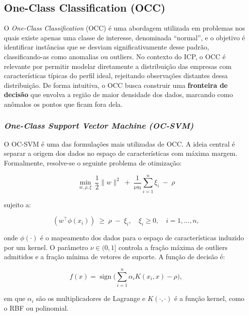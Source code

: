 \subsection{\textbf{One-Class Classification (OCC)}}

O \textit{One-Class Classification} (OCC) é uma abordagem utilizada em
problemas nos quais existe apenas uma classe de interesse, denominada
``normal'', e o objetivo é identificar instâncias que se desviam
significativamente desse padrão, classificando-as como anomalias ou
outliers. No contexto do ICP, o OCC é relevante por permitir modelar
diretamente a distribuição das empresas com características típicas do
perfil ideal, rejeitando observações distantes dessa distribuição. De
forma intuitiva, o OCC busca construir uma \textbf{fronteira de decisão}
que envolva a região de maior densidade dos dados, marcando como anômalos os
pontos que ficam fora dela.

\subsubsection{\textit{One-Class Support Vector Machine (OC-SVM)}}

O OC-SVM \cite{scholkopf2001estimating} é uma das formulações mais utilizadas
de OCC. A ideia central é separar a origem dos dados no espaço de
características com máxima margem. Formalmente, resolve-se o seguinte
problema de otimização:

\begin{equation}
\min_{w,\rho,\xi} \ \frac{1}{2}\lVert w\rVert^2 \;+\; \frac{1}{\nu n}\sum_{i=1}^n \xi_i \;-\; \rho
\end{equation}

sujeito a:

\begin{equation}
(w^\top \phi(x_i)) \;\ge\; \rho \;-\; \xi_i, \quad \xi_i \ge 0, \quad i=1,\dots,n,
\end{equation}

onde $\phi(\cdot)$ é o mapeamento dos dados para o espaço de
características induzido por um kernel. O parâmetro $\nu \in (0,1]$
controla a fração máxima de outliers admitidos e a fração mínima de
vetores de suporte. A função de decisão é:

\begin{equation}
f(x) = \operatorname{sign}\Big(\sum_{i=1}^n \alpha_i K(x_i,x) - \rho \Big),
\end{equation}

em que $\alpha_i$ são os multiplicadores de Lagrange e $K(\cdot,\cdot)$
é a função kernel, como o RBF ou polinomial.

